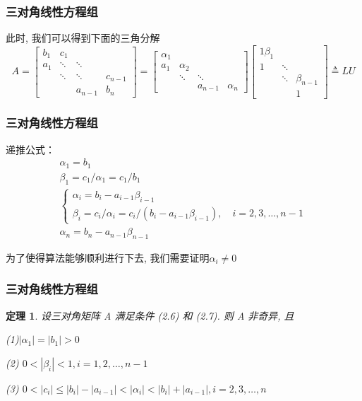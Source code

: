 \documentclass[notheorems,serif]{beamer}
\newcommand{\hei}[1]{{\HEI#1}}
\newtheorem{theorem}{\hei{定理}}
\begin{document}
\begin{frame}
\frametitle{三对角线性方程组}
此时, 我们可以得到下面的三角分解
\begin{equation}
A=\left[\begin{array}{cccc}{b_{1}} & {c_{1}} & {} & {} \\ {a_{1}} & {\ddots} & {\ddots} & {} \\ {} & {\ddots} & {\ddots} & {c_{n-1}} \\ {} & {} & {a_{n-1}} & {b_{n}}\end{array}\right]=\left[\begin{array}{cccc}{\alpha_{1}} & {} & {} & {} \\ {a_{1}} & {\alpha_{2}} & {} & {} \\ {} & {\ddots} & {\ddots} & {} \\ {} & {} & {a_{n-1}} & {\alpha_{n}}\end{array}\right]\left[\begin{array}{cccc}{1 \beta_{1}} \\ {1} & {\ddots} \\ {} & {\ddots} & {\beta_{n-1}} \\ {} & {} & {1}\end{array}\right] \triangleq L U
\end{equation}
\end{frame}

\begin{frame}
\frametitle{三对角线性方程组}
递推公式：
\begin{equation}
\begin{array}{l}{\alpha_{1}=b_{1}} 
\\ {\beta_{1}=c_{1} / \alpha_{1}=c_{1} / b_{1}} 
\\ {\left\{\begin{array}{l}{\alpha_{i}=b_{i}-a_{i-1} \beta_{i-1}} \\ {\beta_{i}=c_{i} / \alpha_{i}=c_{i} /\left(b_{i}-a_{i-1} \beta_{i-1}\right), \quad i=2,3, \ldots, n-1} \end{array}\right.}\\ {\alpha_{n}=b_{n}-a_{n-1} \beta_{n-1}}\end{array}
\end{equation}

为了使得算法能够顺利进行下去, 我们需要证明$\alpha_{i} \neq 0$
\end{frame}

\begin{frame}
\frametitle{三对角线性方程组}
\begin{theorem}
	设三对角矩阵 A 满足条件 (2.6) 和 (2.7). 则 A 非奇异, 且
	
	(1)$\left|\alpha_{1}\right|=\left|b_{1}\right|>0$
	
	(2) $0<\left|\beta_{i}\right|<1, i=1,2, \ldots, n-1$
	
	(3)	$0<\left|c_{i}\right| \leq\left|b_{i}\right|-\left|a_{i-1}\right|<\left|\alpha_{i}\right|<\left|b_{i}\right|+\left|a_{i-1}\right|, i=2,3, \ldots, n$
\end{theorem}
\end{frame}
\end{document}
